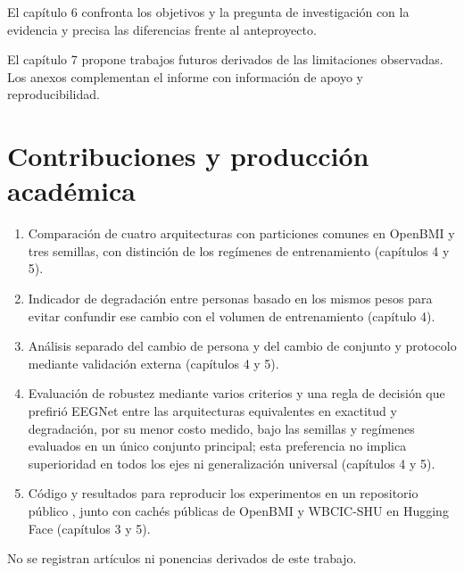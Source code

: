 El capítulo 6 confronta los objetivos y la pregunta de investigación con la evidencia y precisa las diferencias frente al anteproyecto.

El capítulo 7 propone trabajos futuros derivados de las limitaciones observadas. Los anexos complementan el informe con información de apoyo y reproducibilidad.

\section{Contribuciones y producción académica}
\begin{enumerate}
\item Comparación de cuatro arquitecturas con particiones \loso{} comunes en OpenBMI y tres semillas, con distinción de los regímenes de entrenamiento (capítulos 4 y 5).
\item Indicador de degradación entre personas basado en los mismos pesos para evitar confundir ese cambio con el volumen de entrenamiento (capítulo 4).
\item Análisis separado del cambio de persona y del cambio de conjunto y protocolo mediante validación externa (capítulos 4 y 5).
\item Evaluación de robustez mediante varios criterios y una regla de decisión que prefirió EEGNet entre las arquitecturas equivalentes en exactitud \loso{} y degradación, por su menor costo medido, bajo las semillas y regímenes evaluados en un único conjunto principal; esta preferencia no implica superioridad en todos los ejes ni generalización universal (capítulos 4 y 5).
\item Código y resultados para reproducir los experimentos en un repositorio público \cite{ayala2026repo}, junto con cachés públicas de OpenBMI y WBCIC-SHU en Hugging Face (capítulos 3 y 5).
\end{enumerate}
No se registran artículos ni ponencias derivados de este trabajo.
